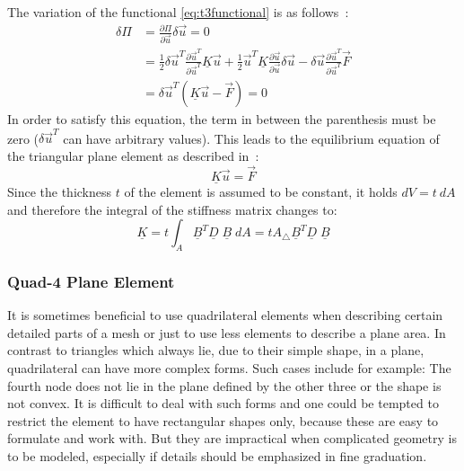   The variation of the functional \eqref{eq:t3functional} is as follows~\cite{steinke2005finite}:
  \begin{align}
  \delta\Pi &= \frac{\partial\Pi}{\partial \vec{u}}\delta\vec{u} = 0 \nonumber\\
            &= \frac{1}{2}\delta\vec{u}^T\frac{\partial\vec{u}^T}{\partial\vec{u}^T}\underline{K}\vec{u} + \frac{1}{2}\vec{u}^T\underline{K}\frac{\partial\vec{u}}{\partial\vec{u}}\delta\vec{u} - \delta\vec{u}\frac{\partial\vec{u}^T}{\partial\vec{u}^T}\vec{F} \nonumber\\
            &= \delta\vec{u}^T\left(\underline{K}\vec{u}-\vec{F}\right) = 0
  \end{align}
  In order to satisfy this equation, the term in between the parenthesis must be zero ($\delta\vec{u}^T$ can have arbitrary values). This leads to the equilibrium equation of the triangular plane element as described in~\cite{steinke2005finite}:
  \begin{equation}
  \underline{K}\vec{u} = \vec{F}
  \end{equation}
  Since the thickness $t$ of the element is assumed to be constant, it holds $dV = t\ dA$ and therefore the integral of the stiffness matrix changes to:
  \begin{equation}
  \underline{K} = t \int_A \underline{B}^T\underline{D}\;\underline{B}\;dA = t A_\triangle \underline{B}^T\underline{D}\;\underline{B}
  \end{equation}
  
  
  
  \subsubsection{Quad-4 Plane Element}\label{sec:Shell-Plane-Quad}
  It is sometimes beneficial to use quadrilateral elements when describing certain detailed parts of a mesh or just to use less elements to describe a plane area. In contrast to triangles which always lie, due to their simple shape, in a plane, quadrilateral can have more complex forms. Such cases include for example: The fourth node does not lie in the plane defined by the other three or the shape is not convex. It is difficult to deal with such forms and one could be tempted to restrict the element to have rectangular shapes only, because these are easy to formulate and work with. But they are impractical when complicated geometry is to be modeled, especially if details should be emphasized in fine graduation.
    
